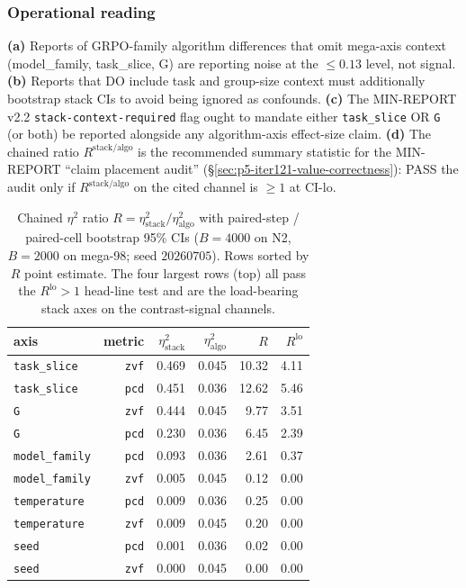 \subsubsection{Operational reading}
\label{sec:p5-iter125-operational}
\textbf{(a)} Reports of GRPO-family algorithm differences that omit
mega-axis context (model\_family, task\_slice, G) are reporting noise
at the $\leq 0.13$ level, not signal. \textbf{(b)} Reports that DO
include task and group-size context must additionally bootstrap stack
CIs to avoid being ignored as confounds. \textbf{(c)} The MIN-REPORT
v2.2 \texttt{stack-context-required} flag ought to mandate either
\texttt{task\_slice} OR \texttt{G} (or both) be reported alongside
any algorithm-axis effect-size claim. \textbf{(d)} The chained ratio
$R^{\mathrm{stack/algo}}$ is the recommended summary statistic for
the MIN-REPORT ``claim placement audit'' (\S\ref{sec:p5-iter121-value-correctness}):
PASS the audit only if $R^{\mathrm{stack/algo}}$ on the cited channel
is $\geq 1$ at CI-lo.

\begin{table}[ht]
\centering\small
\begin{tabular}{lrrrrr}
\toprule
axis & metric & $\eta^2_{\mathrm{stack}}$ & $\eta^2_{\mathrm{algo}}$ &
$R$ & $R^{\mathrm{lo}}$ \\
\midrule
\texttt{task\_slice} & \texttt{zvf}  & 0.469 & 0.045 & 10.32 & 4.11 \\
\texttt{task\_slice} & \texttt{pcd}  & 0.451 & 0.036 & 12.62 & 5.46 \\
\texttt{G}           & \texttt{zvf}  & 0.444 & 0.045 &  9.77 & 3.51 \\
\texttt{G}           & \texttt{pcd}  & 0.230 & 0.036 &  6.45 & 2.39 \\
\midrule
\texttt{model\_family} & \texttt{pcd} & 0.093 & 0.036 & 2.61 & 0.37 \\
\texttt{model\_family} & \texttt{zvf} & 0.005 & 0.045 & 0.12 & 0.00 \\
\texttt{temperature}  & \texttt{pcd} & 0.009 & 0.036 & 0.25 & 0.00 \\
\texttt{temperature}  & \texttt{zvf} & 0.009 & 0.045 & 0.20 & 0.00 \\
\texttt{seed}         & \texttt{pcd} & 0.001 & 0.036 & 0.02 & 0.00 \\
\texttt{seed}         & \texttt{zvf} & 0.000 & 0.045 & 0.00 & 0.00 \\
\bottomrule
\end{tabular}
\caption{Chained $\eta^2$ ratio $R = \eta^2_{\mathrm{stack}} /
\eta^2_{\mathrm{algo}}$ with paired-step / paired-cell bootstrap 95\%
CIs ($B{=}4000$ on N2, $B{=}2000$ on mega-98; seed $20260705$). Rows
sorted by $R$ point estimate. The four largest rows (top) all pass the
$R^{\mathrm{lo}} > 1$ head-line test and are the load-bearing stack
axes on the contrast-signal channels.}
\label{tab:p5-iter125-chained}
\end{table}

